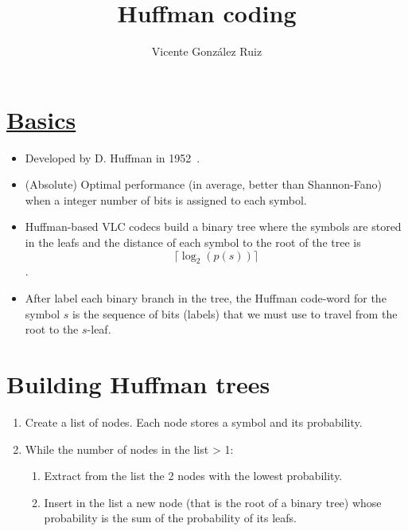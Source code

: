 
\title{Huffman coding}

\author{Vicente González Ruiz}

\maketitle

\section{\href{https://en.wikipedia.org/wiki/Huffman_coding}{Basics}}
\begin{itemize}
  \tightlist
\item Developed by D. Huffman in 1952~\cite{huffman1952method}.
\item
  (Absolute) Optimal performance (in average, better than Shannon-Fano)
  when a integer number of bits is assigned to each symbol.
\item
  Huffman-based VLC codecs build a binary tree where the symbols are
  stored in the leafs and the distance of each symbol to the root of the
  tree is \[\lceil\log_2(p(s))\rceil\].
\item
  After label each binary branch in the tree, the Huffman code-word for
  the symbol \(s\) is the sequence of bits (labels) that we must use to
  travel from the root to the \(s\)-leaf.
\end{itemize}

\section{Building Huffman trees}
\begin{enumerate}
\tightlist
\item
  Create a list of nodes. Each node stores a symbol and its probability.
\item
  While the number of nodes in the list \textgreater{} 1:
  \begin{enumerate}
  \tightlist
  \item
    Extract from the list the 2 nodes with the lowest probability.
  \item
    Insert in the list a new node (that is the root of a binary tree)
    whose probability is the sum of the probability of its leafs.
  \end{enumerate}
\end{enumerate}

